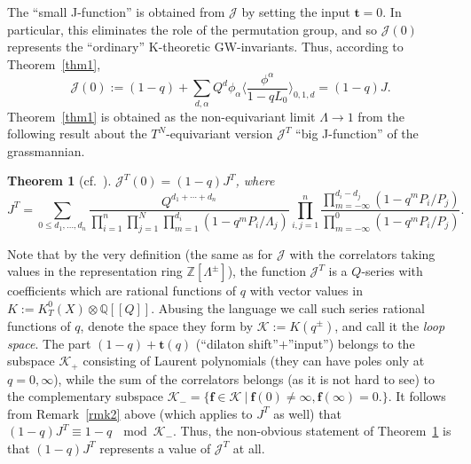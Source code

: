 \documentclass[10pt,a4paper]{amsart}
\numberwithin{equation}{section}
\newtheorem{Theorem}{Theorem}[section]
\def\K{\mathcal K}
\def\J{\mathcal J}
\def\QQ{\mathbb Q}
\def\ZZ{\mathbb Z}
\def\a{\alpha}
\def\f{{\mathbf f}}
\def\t{{\mathbf t}}
\def\lan{\langle}
\def\ran{\rangle}
\theoremstyle{definition}
\theoremstyle{plain}
\begin{document}
The ``small J-function'' is obtained from $\J$ by setting the input $\t=0$. In particular, this eliminates the role of the permutation group, and so $\J(0)$ represents the ``ordinary'' K-theoretic GW-invariants. Thus, according to Theorem~\ref{thm1},
\[
\J(0):=(1-q)+\sum_{d,\a}Q^d\phi_\a\bigg\lan\frac{\phi^\a}{1-qL_0}\bigg\ran_{0,1,d}=(1-q) J.
\]
Theorem~\ref{thm1} is obtained as the non-equivariant limit $\Lambda\to 1$ from the following result about the $T^N$-equivariant version $\J^T$ ``big J-function'' of the grassmannian.

\begin{Theorem}[{cf.~\cite{Taipale, Wen}}]\label{thm2}
$\J^T(0)=(1-q)J^T$, where
\[
J^T=\sum_{0\leq d_1,\dots,d_n}\frac{Q^{d_1+\cdots+d_n}}{\prod_{i=1}^n\prod_{j=1}^N\prod_{m=1}^{d_i}(1-q^mP_i/\Lambda_j)} \prod_{i,j=1}^n\frac{\prod_{m=-\infty}^{d_i-d_j}(1-q^mP_i/P_j)} {\prod_{m=-\infty}^0(1-q^mP_i/P_j)}.
\]
\end{Theorem}

Note that by the very definition (the same as for $\J$ with the correlators taking values in the representation ring $\ZZ[\Lambda^{\pm}]$), the function $\J^T$ is a $Q$-series with coefficients which are rational functions of $q$ with vector values in $K:=K^0_T(X)\otimes \QQ[[Q]]$. Abusing the language we call such series rational functions of $q$, denote the space they form by $\K:=K(q^{\pm})$, and
call it the {\em loop space}. The part $(1-q)+\t(q)$ (``dilaton shift''$+$''input'') belongs to the subspace $\K_{+}$ consisting of Laurent polynomials (they can have poles only at $q=0,\infty$), while the sum of the correlators belongs (as it is not hard to see) to the complementary subspace $\K_{-}=\{ \f \in \K\ | \ \f(0)\neq \infty, \f(\infty)=0.\}$. It follows from Remark~\ref{rmk2} above (which applies to $J^T$ as well) that $(1-q)J^T\equiv 1-q\ \mod \K_{-}$. Thus, the non-obvious statement of Theorem~\ref{thm2} is that $(1-q)J^T$ represents a value of $\J^T$ at all.
\end{document}
